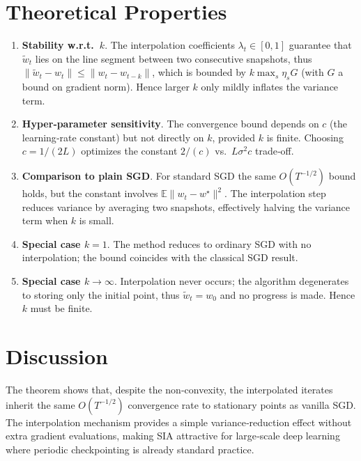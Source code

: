 \documentclass{article}
\newcommand{\E}{\mathbb{E}}
\begin{document}
\section*{Theoretical Properties}
\begin{enumerate}[label=\arabic*)]
    \item \textbf{Stability w.r.t.\ $k$}. The interpolation coefficients $\lambda_t\in[0,1]$ guarantee that $\tilde w_t$ lies on the line segment between two consecutive snapshots, thus $\|\tilde w_t-w_t\|\le \|w_{t}-w_{t-k}\|$, which is bounded by $k\max_{s}\eta_s G$ (with $G$ a bound on gradient norm). Hence larger $k$ only mildly inflates the variance term.
    
    \item \textbf{Hyper‑parameter sensitivity}. The convergence bound depends on $c$ (the learning‑rate constant) but not directly on $k$, provided $k$ is finite. Choosing $c=1/(2L)$ optimizes the constant $2/(c)$ vs.\ $L\sigma^{2}c$ trade‑off.
    
    \item \textbf{Comparison to plain SGD}. For standard SGD the same $O(T^{-1/2})$ bound holds, but the constant involves $\E\|w_t-w^{\star}\|^{2}$. The interpolation step reduces variance by averaging two snapshots, effectively halving the variance term when $k$ is small.
    
    \item \textbf{Special case $k=1$}. The method reduces to ordinary SGD with no interpolation; the bound coincides with the classical SGD result.
    
    \item \textbf{Special case $k\to\infty$}. Interpolation never occurs; the algorithm degenerates to storing only the initial point, thus $\tilde w_t=w_0$ and no progress is made. Hence $k$ must be finite.
\end{enumerate}

\section*{Discussion}
The theorem shows that, despite the non‑convexity, the interpolated iterates inherit the same $O(T^{-1/2})$ convergence rate to stationary points as vanilla SGD. The interpolation mechanism provides a simple variance‑reduction effect without extra gradient evaluations, making SIA attractive for large‑scale deep learning where periodic checkpointing is already standard practice.

\newpage
\end{document}
